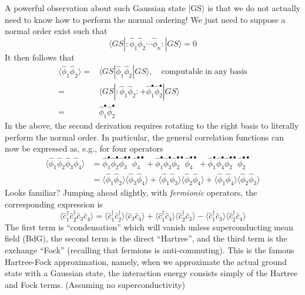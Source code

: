 A powerful observation about such Gaussian state $|\mathrm{GS}\rangle$ is that we do not actually need to know how to perform the normal ordering! We just need to suppose a normal order exist such that
\[ \langle GS|:\hat{\phi}_1\hat{\phi}_2\cdots \hat{\phi}_n:|GS\rangle =0\]
It then follows that
\begin{align*}
    \langle \hat{\phi}_1\hat{\phi}_2\rangle =&\langle GS|\hat{\phi}_1\hat{\phi}_2|GS\rangle ,\quad \mathrm{computable\;in\;any\;basis}\\
    =&\langle GS|:\hat{\phi}_1\hat{\phi}_2:+\hat{\phi}_{1}^{\bullet}\hat{\phi}_{2}^{\bullet}|GS\rangle \\
    =&\hat{\phi}_{1}^{\bullet}\hat{\phi}_{2}^{\bullet}
\end{align*}
In the above, the second derivation requires rotating to the right basis to literally perform the normal order. In particular, the general correlation functions can now be expressed as, e.g., for four operators
\begin{align*}
    \langle \hat{\phi}_1\hat{\phi}_2\hat{\phi}_3\hat{\phi}_4\rangle &=\hat{\phi}_{1}^{\bullet}\hat{\phi}_{2}^{\bullet}\hat{\phi}_{3}^{\bullet \bullet}\hat{\phi}_{4}^{\bullet \bullet}+\hat{\phi}_{1}^{\bullet}\hat{\phi}_{3}^{\bullet}\hat{\phi}_{2}^{\bullet \bullet}\hat{\phi}_{4}^{\bullet \bullet}+\hat{\phi}_{1}^{\bullet}\hat{\phi}_{4}^{\bullet}\hat{\phi}_{2}^{\bullet \bullet}\hat{\phi}_{2}^{\bullet \bullet}\\
    &=\langle \hat{\phi}_1\hat{\phi}_2\rangle \langle \hat{\phi}_3\hat{\phi}_4\rangle +\langle \hat{\phi}_1\hat{\phi}_3\rangle \langle \hat{\phi}_2\hat{\phi}_4\rangle +\langle \hat{\phi}_1\hat{\phi}_4\rangle \langle \hat{\phi}_2\hat{\phi}_3\rangle
\end{align*}
Looks familiar? Jumping ahead slightly, with \emph{fermionic} operators, the corresponding expression is
\[ \langle \hat{c}_{1}^{\dagger}\hat{c}_{2}^{\dagger}\hat{c}_3\hat{c}_4\rangle =\langle \hat{c}_{1}^{\dagger}\hat{c}_{2}^{\dagger}\rangle \langle \hat{c}_3\hat{c}_4\rangle +\langle \hat{c}_{1}^{\dagger}\hat{c}_4\rangle \langle \hat{c}_{2}^{\dagger}\hat{c}_3\rangle -\langle \hat{c}_{1}^{\dagger}\hat{c}_3\rangle \langle \hat{c}_{2}^{\dagger}\hat{c}_4\rangle \]
The first term is ``condensation'' which will vanish unless superconducting mean field (BdG), the second term is the direct ``Hartree'', and the third term is the exchange ``Fock'' (recalling that fermions is anti-commuting). This is the famous Hartree-Fock approximation, namely, when we approximate the actual ground state with a Gaussian state, the interaction energy consists simply of the Hartree and Fock terms. (Assuming no superconductivity)

